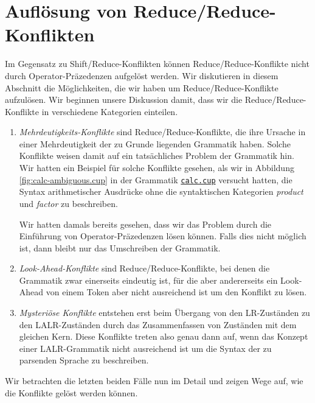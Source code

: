 \section{Aufl\"osung von Reduce/Reduce-Konflikten}
Im Gegensatz zu Shift/Reduce-Konflikten k\"onnen Reduce/Reduce-Konflikte nicht durch Operator-Pr\"azedenzen
aufgel\"ost werden.  Wir diskutieren in diesem Abschnitt die M\"oglichkeiten, die wir haben um
Reduce/Reduce-Konflikte aufzul\"osen.  Wir beginnen unsere Diskussion damit, dass wir die
Reduce/Reduce-Konflikte in verschiedene Kategorien einteilen. 
\begin{enumerate}
\item \emph{Mehrdeutigkeits-Konflikte} sind Reduce/Reduce-Konflikte, die ihre Ursache in einer Mehrdeutigkeit
      der zu Grunde liegenden Grammatik haben.  Solche Konflikte weisen damit auf ein tats\"achliches
      Problem der Grammatik hin.  Wir hatten ein Beispiel f\"ur solche Konflikte gesehen, als wir in
      Abbildung \ref{fig:calc-ambiguous.cup} in der Grammatik
      \href{https://github.com/karlstroetmann/Formal-Languages/tree/master/Cup/Calculator-Ambiguous/calc.cup}{\texttt{calc.cup}} 
      versucht hatten, die Syntax arithmetischer Ausdr\"ucke ohne die syntaktischen
      Kategorien \textsl{product} und \textsl{factor} zu beschreiben.

      Wir hatten damals bereits gesehen, dass wir das Problem durch die Einf\"uhrung von
      Operator-Pr\"azedenzen l\"osen k\"onnen.  Falls dies nicht m\"oglich ist, dann bleibt nur das
      Umschreiben der Grammatik.
\item \emph{Look-Ahead-Konflikte} sind Reduce/Reduce-Konflikte, bei denen die Grammatik zwar
      einerseits eindeutig ist, f\"ur die aber andererseits
      ein Look-Ahead von einem Token aber nicht ausreichend ist um den Konflikt zu l\"osen.
\item \emph{Mysteri\"ose Konflikte} entstehen erst beim \"Ubergang von den LR-Zust\"anden zu den LALR-Zust\"anden 
      durch das Zusammenfassen von Zust\"anden mit dem gleichen Kern.  Diese Konflikte treten also
      genau dann auf, wenn das Konzept einer LALR-Grammatik nicht ausreichend ist um die Syntax der
      zu parsenden Sprache zu beschreiben.
\end{enumerate}
Wir betrachten die letzten beiden F\"alle nun im Detail und zeigen Wege auf, wie die Konflikte gel\"ost
werden k\"onnen.

